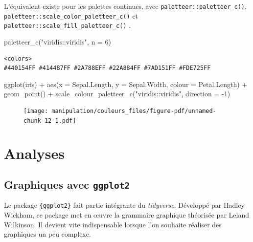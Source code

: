 \documentclass[
  letterpaper,
  DIV=11,
  numbers=noendperiod,
  oneside]{scrreprt}
\newenvironment{Shaded}{\begin{snugshade}}{\end{snugshade}}
\newcommand{\AttributeTok}[1]{\textcolor[rgb]{0.40,0.45,0.13}{#1}}
\newcommand{\DecValTok}[1]{\textcolor[rgb]{0.68,0.00,0.00}{#1}}
\newcommand{\FunctionTok}[1]{\textcolor[rgb]{0.28,0.35,0.67}{#1}}
\newcommand{\NormalTok}[1]{\textcolor[rgb]{0.00,0.23,0.31}{#1}}
\newcommand{\SpecialCharTok}[1]{\textcolor[rgb]{0.37,0.37,0.37}{#1}}
\newcommand{\StringTok}[1]{\textcolor[rgb]{0.13,0.47,0.30}{#1}}
\begin{document}
L'équivalent existe pour les palettes continues, avec
\texttt{paletteer::paletteer\_c()},
\texttt{paletteer::scale\_color\_paletteer\_c()} et
\texttt{paletteer::scale\_fill\_paletteer\_c()} .

\begin{Shaded}
\begin{Highlighting}[]
\FunctionTok{paletteer\_c}\NormalTok{(}\StringTok{"viridis::viridis"}\NormalTok{, }\AttributeTok{n =} \DecValTok{6}\NormalTok{)}
\end{Highlighting}
\end{Shaded}

\begin{verbatim}
<colors>
#440154FF #414487FF #2A788EFF #22A884FF #7AD151FF #FDE725FF 
\end{verbatim}

\begin{Shaded}
\begin{Highlighting}[]
\FunctionTok{ggplot}\NormalTok{(iris) }\SpecialCharTok{+}
  \FunctionTok{aes}\NormalTok{(}\AttributeTok{x =}\NormalTok{ Sepal.Length, }\AttributeTok{y =}\NormalTok{ Sepal.Width, }\AttributeTok{colour =}\NormalTok{ Petal.Length) }\SpecialCharTok{+}
  \FunctionTok{geom\_point}\NormalTok{() }\SpecialCharTok{+}
  \FunctionTok{scale\_colour\_paletteer\_c}\NormalTok{(}\StringTok{"viridis::viridis"}\NormalTok{, }\AttributeTok{direction =} \SpecialCharTok{{-}}\DecValTok{1}\NormalTok{)}
\end{Highlighting}
\end{Shaded}

\begin{figure}[H]

{\centering \texttt{[image: manipulation/couleurs\_files/figure-pdf/unnamed-chunk-12-1.pdf]}

}

\end{figure}

\part{\textbf{Analyses}}

\hypertarget{sec-ggplot2}{%
\chapter{\texorpdfstring{Graphiques avec
\texttt{ggplot2}}{Graphiques avec ggplot2}}\label{sec-ggplot2}}

Le package \texttt{\{ggplot2\}} fait partie intégrante du
\emph{tidyverse}. Développé par Hadley Wickham, ce package met en œuvre
la grammaire graphique théorisée par Leland Wilkinson. Il devient vite
indispensable lorsque l'on souhaite réaliser des graphiques un peu
complexe.
\end{document}
